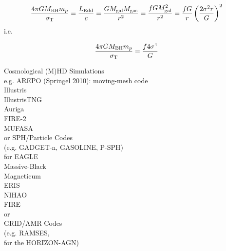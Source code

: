 \documentclass[11pt,a4paper]{article}
\begin{document}
\begin{equation}
\frac{4 \pi G M_{\rm BH} m_p}{\sigma_{\rm T}} = \frac{L_{\rm Edd}}{c} 
                                                                    = \frac{G M_{\rm gal} M_{\rm gas}}{r^2} 
                                                                    = \frac{f G M^{2}_{\rm gal}}{r^2} 
                                                                     = \frac{fG}{r} \left ( \frac{2\sigma^{2} r}{G}  \right )^2
\end{equation}
i.e. 

\begin{equation}
\frac{4 \pi G M_{\rm BH} m_p}{\sigma_{\rm T}} = \frac{f4\sigma^{4}}{G}
\end{equation}

Cosmological (M)HD Simulations \\
e.g. AREPO (Springel 2010): moving-mesh code  \\
Illustris  \\
IllustrisTNG \\
Auriga \\
FIRE-2  \\
MUFASA \\

or SPH/Particle Codes \\
(e.g. GADGET-n, GASOLINE, P-SPH) \\
for EAGLE  \\
Massive-Black  \\
Magneticum  \\
ERIS  \\
NIHAO  \\
FIRE \\

or \\
GRID/AMR Codes \\
(e.g. RAMSES,  \\
for the HORIZON-AGN)\\
\end{document}
